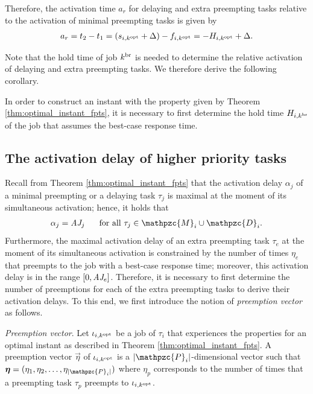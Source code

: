 Therefore, the activation time $a_r$ for delaying and extra preempting tasks relative to the activation of minimal preempting tasks is given by
\begin{align} \label{eqn:relative_activation_extra_delaying}
a_r = t_2 - t_1 = (s_{i,k^{\rm{opt}}}+\Delta) - f_{i,k^{\rm{opt}}} = -H_{i,k^{\rm{opt}}}+\Delta.
\end{align}

Note that the hold time of job $k^{\rm{br}}$ is needed to determine the relative activation of delaying and extra preempting tasks. We therefore derive the following corollary.
\begin{corollary} \label{cor:hold_time_dor_optimal_instant}
	In order to construct an instant with the property given by Theorem \ref{thm:optimal_instant_fpts}, it is necessary to first determine the hold time $H_{i,k^{\rm{br}}}$ of the job that assumes the best-case response time.
\end{corollary}

\fi

\subsection{The activation delay of higher priority tasks}

Recall from Theorem \ref{thm:optimal_instant_fpts} that the activation delay $\alpha_j$ of a minimal preempting or a delaying task $\tau_j$ is maximal at the moment of its simultaneous activation; hence, it holds that
\begin{align}\label{eqn:activation_delay_minimal_delaying}
	\alpha_j = \aj_j \hspace{.6cm} \textnormal{for all $\tau_j \in \mathpzc{M}_i \cup \mathpzc{D}_i$}.
\end{align}
Furthermore, the maximal activation delay of an extra preempting task $\tau_e$ at the moment of its simultaneous activation is constrained by the number of times $\eta_e$ that preempts to the job with a best-case response time; moreover, this activation delay is in the range $[0,\mbox{\it AJ}_e]$. Therefore, it is necessary to first determine the number of preemptions for each of the extra preempting tasks to derive their activation delays. To this end, we first introduce the notion of \textit{preemption vector} as follows.

\begin{definition}
	\textit{Preemption vector}.
	Let $\iota_{i,k^{\rm{opt}}}$ be a job of $\tau_i$ that experiences the properties for an optimal instant as described in Theorem \ref{thm:optimal_instant_fpts}. A preemption vector $\vec{\eta}$ of $\iota_{i,k^{\rm{opt}}}$ is a $|\mathpzc{P}_i|$-dimensional vector such that $\vec{\eta}=(\eta_1, \eta_2,\dots,\eta_{|\mathpzc{P}_i|})$ where $\eta_p$ corresponds to the number of times that a preempting task $\tau_p$ preempts to $\iota_{i,k^{\rm{opt}}}$.
\end{definition}

